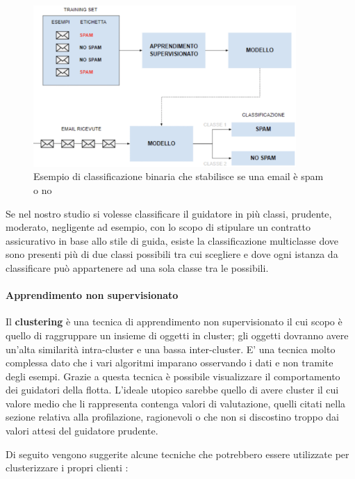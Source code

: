 \documentclass[12pt, a4paper, italian]{report}
\numberwithin{figure}{chapter}
\numberwithin{table}{chapter}
\begin{document}
\begin{figure}[h] \centering
\includegraphics[width=10cm]{Classificazione.png}
\caption{Esempio di classificazione binaria che stabilisce se una email è spam o no\protect\footnotemark}
\label{fig:Classificazione binaria}
\end{figure}
Se nel nostro studio si volesse classificare il guidatore in più classi, prudente, moderato, negligente ad esempio, con lo scopo di stipulare un contratto assicurativo in base allo stile di guida, esiste la classificazione multiclasse dove sono presenti più di due classi possibili tra cui scegliere e dove ogni istanza da classificare può appartenere ad una sola classe tra le possibili.

\paragraph{Apprendimento non supervisionato}
Il \textbf{clustering} è una tecnica di apprendimento non supervisionato il cui scopo è quello di raggruppare un insieme di oggetti in cluster; gli oggetti dovranno avere un'alta similarità intra-cluster e una bassa inter-cluster. E' una tecnica molto complessa dato che i vari algoritmi imparano osservando i dati e non tramite degli esempi. Grazie a questa tecnica è possibile visualizzare il comportamento dei guidatori della flotta. L'ideale utopico sarebbe quello di avere cluster il cui valore medio che li rappresenta contenga valori di valutazione, quelli citati nella sezione relativa alla profilazione, ragionevoli o che non si discostino troppo dai valori attesi del guidatore prudente.

\vspace{0.5cm}
Di seguito vengono suggerite alcune tecniche che potrebbero essere utilizzate per clusterizzare i propri clienti \cite{popat2014review}: 
\end{document}
